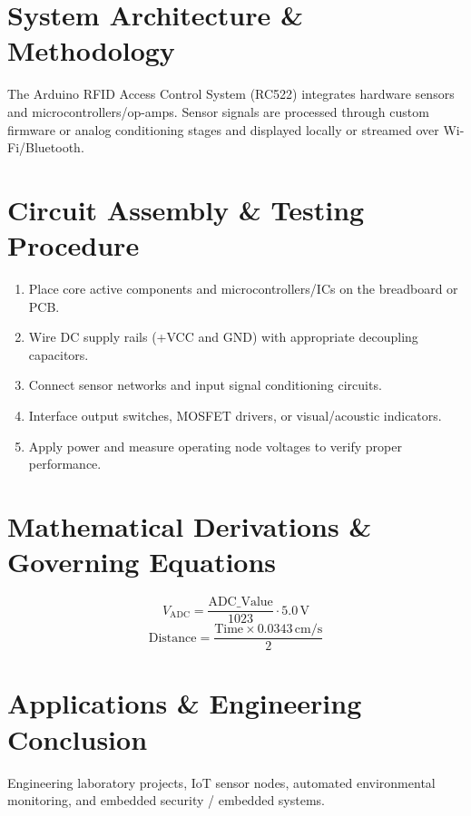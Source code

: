 \documentclass[11pt,a4paper]{article}
\begin{document}
\section{System Architecture \& Methodology}
The Arduino RFID Access Control System (RC522) integrates hardware sensors and microcontrollers/op-amps. Sensor signals are processed through custom firmware or analog conditioning stages and displayed locally or streamed over Wi-Fi/Bluetooth.

\section{Circuit Assembly \& Testing Procedure}
\begin{enumerate}
    \item Place core active components and microcontrollers/ICs on the breadboard or PCB.
    \item Wire DC supply rails (+VCC and GND) with appropriate decoupling capacitors.
    \item Connect sensor networks and input signal conditioning circuits.
    \item Interface output switches, MOSFET drivers, or visual/acoustic indicators.
    \item Apply power and measure operating node voltages to verify proper performance.
\end{enumerate}

\section{Mathematical Derivations \& Governing Equations}
\begin{equation}
V_{\text{ADC}} = \frac{\text{ADC\_Value}}{1023} \cdot 5.0\,\text{V}
\end{equation}
\begin{equation}
\text{Distance} = \frac{\text{Time} \times 0.0343\,\text{cm/s}}{2}
\end{equation}

\section{Applications \& Engineering Conclusion}
Engineering laboratory projects, IoT sensor nodes, automated environmental monitoring, and embedded security / embedded systems.
\end{document}
